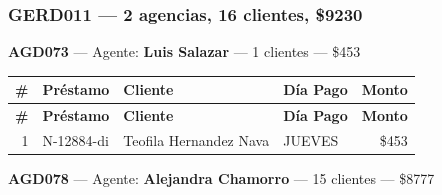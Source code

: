 \documentclass[11pt,a4paper]{article}
\newcommand{\money}[1]{\$\num{#1}}
\begin{document}
\subsubsection{GERD011 --- 2 agencias, 16 clientes, \money{9230}}

\noindent\textbf{AGD073} --- Agente: \textbf{Luis Salazar} --- 1 clientes --- \money{453}


\begin{center}
\renewcommand{\arraystretch}{1.1}
\footnotesize
\begin{longtable}{rlp{6.5cm}lr}
\toprule
\textbf{\#} & \textbf{Pr\'estamo} & \textbf{Cliente} & \textbf{D\'ia Pago} & \textbf{Monto} \\
\midrule
\endfirsthead
\toprule
\textbf{\#} & \textbf{Pr\'estamo} & \textbf{Cliente} & \textbf{D\'ia Pago} & \textbf{Monto} \\
\midrule
\endhead
1 & N-12884-di & Teofila Hernandez Nava & JUEVES & \money{453} \\

\bottomrule
\end{longtable}
\end{center}
\noindent\textbf{AGD078} --- Agente: \textbf{Alejandra Chamorro} --- 15 clientes --- \money{8777}
\end{document}
